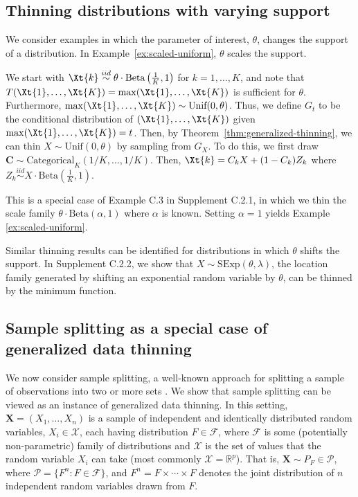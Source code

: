 \documentclass[12pt]{article}
\begin{document}
\subsection{Thinning distributions with varying support} \label{sec:varysupport}

We consider examples in which the parameter of interest, $\theta$, changes the support of a distribution. 
In Example~\ref{ex:scaled-uniform}, $\theta$ scales the support.  

\begin{exmp} \label{ex:scaled-uniform}
We start with  $\Xt{k} \overset{iid}{\sim} \theta \cdot\text{Beta}\left(\frac{1}{K},1\right)$ for $k=1,\ldots,K$, and note that $T(\Xt{1},\dots,\Xt{K}) = \max(\Xt{1},\dots,\Xt{K})$ is sufficient for $\theta$. 
 Furthermore, $\max(\Xt{1},\dots,\Xt{K}) \sim \text{Unif}(0, \theta)$. Thus, we define $G_t$ to be the conditional distribution of 
 $(\Xt{1},\dots,\Xt{K})$ given $\max(\Xt{1},\dots,\Xt{K}) = t$. Then, 
 by Theorem~\ref{thm:generalized-thinning}, 
 we can thin  $X \sim \text{Unif}(0, \theta)$ by 
 sampling from  $G_X$. 
To do this, we first   
draw $\mathbf{C}\sim\text{Categorical}_K\left(1/K, \ldots, 1/K\right)$. Then, $\Xt{k} = C_kX+(1-C_k)Z_k$ where $Z_k \overset{iid}{\sim} X\cdot\text{Beta}\left(\frac{1}{K},1\right)$.
\end{exmp}
This is a special case of Example C.3 in Supplement C.2.1, in which we thin the scale family $\theta\cdot\text{Beta}(\alpha,1)$ where $\alpha$ is known. Setting $\alpha=1$ yields Example \ref{ex:scaled-uniform}.

Similar thinning results can be identified for distributions in which $\theta$ shifts the support. In Supplement C.2.2, we show that $X\sim \mathrm{SExp}(\theta,\lambda)$, the location family generated by shifting an exponential random variable by $\theta$, can be thinned by the minimum function.

\subsection{Sample splitting as a special case of generalized data thinning}\label{sec:sample-splitting}

We now consider sample splitting, a well-known approach for splitting a sample of  observations into two or more sets \citep{cox1975note}. 
We show that sample splitting can be viewed as an instance of generalized data thinning. In this setting, $\mathbf{X}=(X_1,\ldots,X_n)$ is a sample of independent and identically distributed random variables, $X_i\in\mathcal X$, each having distribution $F\in\mathcal F$, where $\mathcal F$ is some (potentially non-parametric) family of distributions and $\mathcal X$ is the set of values that the random variable $X_i$ can take (most commonly $\mathcal X=\mathbb R^p$).  That is, $\mathbf{X}\sim P_F\in \mathcal P$, where
$\mathcal P=\{F^n:F\in\mathcal F\}$,
and $F^n=F\times\cdots\times F$ denotes the joint distribution of $n$ independent random variables drawn from $F$. 
\end{document}
